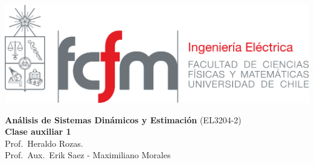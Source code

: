\documentclass[
  11pt,
  letterpaper,
   addpoints,
   answers
  ]{exam}
\begin{document}
\noindent
\begin{minipage}{0.47\textwidth}
\includegraphics[width=\textwidth]{../fcfm_die}
\end{minipage}
\begin{minipage}{0.53\textwidth}
\begin{center} 
\large\textbf{Análisis de Sistemas Dinámicos y Estimación} (EL3204-2) \\
\large\textbf{Clase auxiliar 1} \\
\normalsize Prof.~Heraldo Rozas.\\
\normalsize Prof.~Aux.~Erik Saez - Maximiliano Morales
\end{center}
\end{minipage}

\vspace{0.5cm}
\noindent
\vspace{.85cm}
\end{document}
